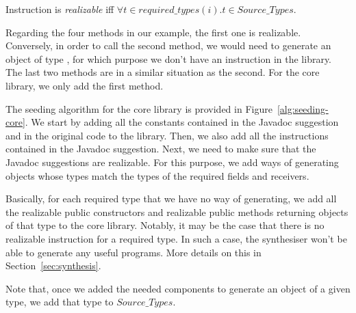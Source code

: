 \documentclass[runningheads,a4paper]{llncs}
\begin{document}
\begin{definition}\label{def:realizable}
Instruction  is {\em realizable} iff $\forall t \in required\_types(i). t \in Source\_Types$.
  
\end{definition}

Regarding the four methods in our example, the first one is realizable. Conversely, in order to call the second method, we would need to generate an object of type ,
for which purpose we don't have an instruction in the library.
The last two methods are in a similar situation as the second. For the core library, we only add the first method.


The seeding algorithm for the core library is provided in Figure~\ref{alg:seeding-core}.
We start by adding all the constants contained in the Javadoc suggestion
and in the original code to the library. Then, we also add all the instructions contained
in the Javadoc suggestion. Next, we need to make sure that the Javadoc suggestions
are realizable. For this purpose, we add ways of generating
objects whose types match the types of the required fields and receivers.

Basically, for each required type that we have no way of generating, we add all the realizable
public constructors and realizable public methods returning objects of that type to the
core library.
Notably, it may be the case that there is no realizable instruction for a required type.
In such a case, the synthesiser won't be able to generate any useful programs.
More details on this in Section~\ref{sec:synthesis}.

Note that, once we added the needed components to generate an object of a given type,
we add that type to $Source\_Types$.


\end{document}
